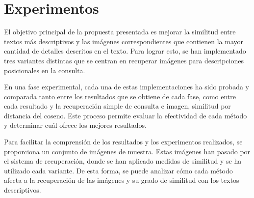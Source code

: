 \section{Experimentos}
El objetivo principal de la propuesta presentada es mejorar la similitud entre textos m\'as descriptivos y las im\'agenes correspondientes que contienen la mayor cantidad de detalles descritos en el texto. Para lograr esto, se han implementado tres variantes distintas que se centran en recuperar im\'agenes para descripciones posicionales en la consulta.

En una fase experimental, cada una de estas implementaciones ha sido probada y comparada tanto entre los resultados que se obtiene de cada fase, como entre cada resultado y la recuperación simple de consulta e imagen, similitud por distancia del coseno. Este proceso permite evaluar la efectividad de cada método y determinar cu\'al ofrece los mejores resultados.

Para facilitar la comprensión de los resultados y los experimentos realizados, se proporciona un conjunto de im\'agenes de muestra. Estas im\'agenes han pasado por el sistema de recuperación, donde se han aplicado medidas de similitud y se ha utilizado cada variante. De esta forma, se puede analizar cómo cada método afecta a la recuperación de las im\'agenes y su grado de similitud con los textos descriptivos.


